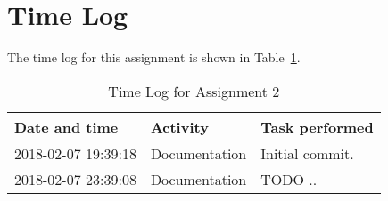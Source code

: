 %
%
%


\section{Time Log}
% 


The time log for this assignment is shown in Table~\ref{table-timelog}.

%
%

\begin{table}[]
  \centering
  \begin{tabular}{@{}l|l|l}
    \toprule
    Date and time       & Activity      & Task performed                            \\
    \midrule
    2018-02-07 19:39:18 & Documentation & Initial commit.                           \\
    2018-02-07 23:39:08 & Documentation & TODO ..                                   \\
    \bottomrule
  \end{tabular}
  \caption{Time Log for Assignment 2}
  \label{table-timelog}
\end{table}

